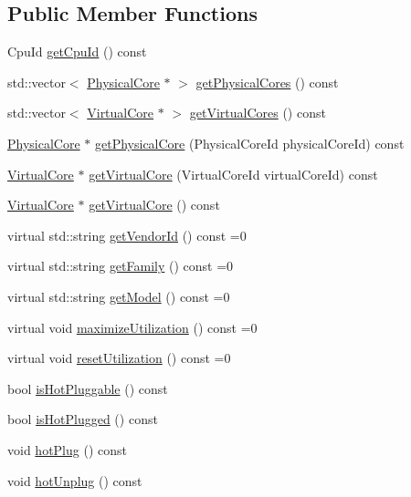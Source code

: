 \subsection*{Public Member Functions}
\begin{DoxyCompactItemize}
\item 
Cpu\-Id \hyperlink{classmammut_1_1topology_1_1Cpu_ab8f01a27491ad5bc899e99374279ae12}{get\-Cpu\-Id} () const 
\item 
std\-::vector$<$ \hyperlink{classmammut_1_1topology_1_1PhysicalCore}{Physical\-Core} $\ast$ $>$ \hyperlink{classmammut_1_1topology_1_1Cpu_a25fbc331fe90d9153b3d49df76cd18e0}{get\-Physical\-Cores} () const 
\item 
std\-::vector$<$ \hyperlink{classmammut_1_1topology_1_1VirtualCore}{Virtual\-Core} $\ast$ $>$ \hyperlink{classmammut_1_1topology_1_1Cpu_a3b79c5d3a7b1173abf92719d86a6e72a}{get\-Virtual\-Cores} () const 
\item 
\hyperlink{classmammut_1_1topology_1_1PhysicalCore}{Physical\-Core} $\ast$ \hyperlink{classmammut_1_1topology_1_1Cpu_aec31e3b1a9a6a34dc8413e5ede679525}{get\-Physical\-Core} (Physical\-Core\-Id physical\-Core\-Id) const 
\item 
\hyperlink{classmammut_1_1topology_1_1VirtualCore}{Virtual\-Core} $\ast$ \hyperlink{classmammut_1_1topology_1_1Cpu_a0155129f705cb026e4ce62fdae831a7d}{get\-Virtual\-Core} (Virtual\-Core\-Id virtual\-Core\-Id) const 
\item 
\hyperlink{classmammut_1_1topology_1_1VirtualCore}{Virtual\-Core} $\ast$ \hyperlink{classmammut_1_1topology_1_1Cpu_ad37f4a4ca3522a55da403ff6ffca4cf2}{get\-Virtual\-Core} () const 
\item 
virtual std\-::string \hyperlink{classmammut_1_1topology_1_1Cpu_a7b1fcfcc8df09588832ca1dc6351e6f1}{get\-Vendor\-Id} () const =0
\item 
virtual std\-::string \hyperlink{classmammut_1_1topology_1_1Cpu_a14f0984b504c0c207250829728193f8c}{get\-Family} () const =0
\item 
virtual std\-::string \hyperlink{classmammut_1_1topology_1_1Cpu_a6e98555afbc9d4985acc4ec30fbc5d96}{get\-Model} () const =0
\item 
virtual void \hyperlink{classmammut_1_1topology_1_1Cpu_a249829ade28b8fffcda1d2666cf68997}{maximize\-Utilization} () const =0
\item 
virtual void \hyperlink{classmammut_1_1topology_1_1Cpu_a3eea41d7ad6200d83301102f23944de5}{reset\-Utilization} () const =0
\item 
bool \hyperlink{classmammut_1_1topology_1_1Cpu_a66e87ce11f3cd165e365aa28a2ad5131}{is\-Hot\-Pluggable} () const 
\item 
bool \hyperlink{classmammut_1_1topology_1_1Cpu_a1dd13ebad738464902ef86201aa6ce9e}{is\-Hot\-Plugged} () const 
\item 
void \hyperlink{classmammut_1_1topology_1_1Cpu_adb0ec08e6a59557c7a4dad362cd0d5ec}{hot\-Plug} () const 
\item 
void \hyperlink{classmammut_1_1topology_1_1Cpu_a0e4cbd903835d2ca9b3d16bcb91f692f}{hot\-Unplug} () const 
\end{DoxyCompactItemize}
